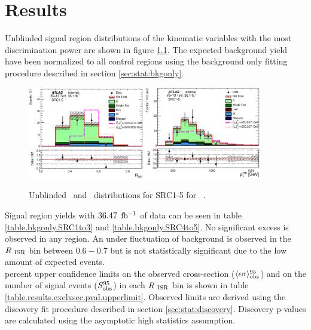 \chapter{Results}
\label{chap:Results}

\indent Unblinded signal region distributions of the kinematic variables with the most discrimination power are shown in figure \ref{fig:SRCUnblined}.  The expected background yield have been normalized to all control regions using the background only fitting procedure described in section \ref{sec:stat:bkgonly}.  \\

\begin{figure}[!hp] 
\begin{center}
\includegraphics[width=0.45\textwidth]{figures/SRC/CA_RISR_SRC1_5}
\includegraphics[width=0.45\textwidth]{figures/SRC/CA_PTISR_SRC1_5}
\caption{Unblinded \rISR\ and \pTISR\ distributions for SRC1-5 for \intlumi\ \ifb.}
\label{fig:SRCUnblined}
\end{center}
\end{figure}

\indent Signal region yields with $36.47$ $\mbox{fb$^{-1}$}$ of data can be seen in table \ref{table.bkgonly.SRC1to3} and \ref{table.bkgonly.SRC4to5}.  No significant excess is observed in any region.  An under fluctuation of background is observed in the $R_{~\mathrm{ISR}}$ bin between $0.6-0.7$ but is not statistically significant due to the low amount of expected events.  \\




 percent upper confidence limits on the observed cross-section ($\langle\epsilon\sigma\rangle_{\rm obs}^{95}$) and on the number of signal events ($S_{\rm obs}^{95}$) in each $R_{~\mathrm{ISR}}$ bin is shown in table \ref{table.results.exclxsec.pval.upperlimit}.  Observed limits are derived using the discovery fit procedure described in section \ref{sec:stat:discovery}.  Discovery p-values are calculated using the asymptotic high statistics assumption.  \\

